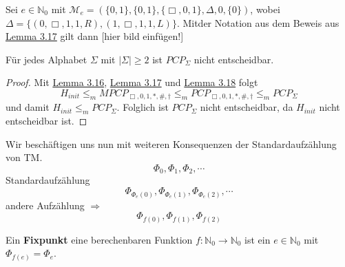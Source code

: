    Sei $e \in \mathbb{N}_0$ mit $\mathcal{M}_e = (\{0, 1\}, \{0, 1\}, \{\Box, 0, 1\}, \Delta, 0, \{0\})$, wobei $\Delta = \{(0, \Box, 1, 1, R), (1, \Box, 1, 1, L)\}$. Mitder Notation aus dem Beweis aus \hyperref[subsec:3.16]{Lemma 3.17} gilt dann [hier bild einfügen!]

   Für jedes Alphabet $\Sigma$ mit $|\Sigma| \geq 2$ ist $PCP_{\Sigma}$ nicht entscheidbar. 
  \begin{proof}
    Mit \hyperref[subsec:3.16]{Lemma 3.16}, \hyperref[subsec:3.17]{Lemma 3.17} und \hyperref[subsec:3.18]{Lemma 3.18} folgt \[H_{init} \leq_m MPCP_{\Box, 0, 1, *, \#, \dagger} \leq_m PCP_{\Box, 0, 1, *, \#, \dagger} \leq_m PCP_{\Sigma}\] und damit $H_{init} \leq_m PCP_{\Sigma}$. Folglich ist $PCP_{\Sigma}$ nicht entscheidbar, da $H_{init}$ nicht entscheidbar ist.
  \end{proof}

  
  Wir beschäftigen uns nun mit weiteren Konsequenzen der Standardaufzählung von TM. \[ \Phi_0, \Phi_1, \Phi_2, \cdots \] Standardaufzählung \[\Phi_{\Phi_e(0)}, \Phi_{\Phi_e(1)}, \Phi_{\Phi_e(2)}, \cdots\] andere Aufzählung $\Rightarrow$ \[\Phi_{f(0)}, \Phi_{f(1)}, \Phi_{f(2)}\]

   Ein \textbf{Fixpunkt} eine berechenbaren Funktion $f: \mathbb{N}_0 \to \mathbb{N}_0$ ist ein $e \in \mathbb{N}_0$ mit $\Phi_{f(e)} = \Phi_e$.


